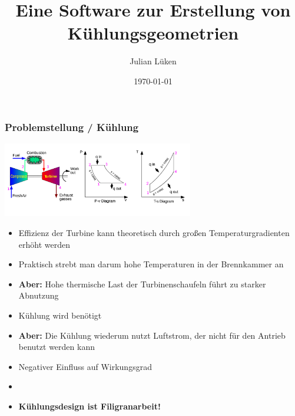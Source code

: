 \documentclass[8pt, aspectratio=169]{beamer}
\title[CoolingGen]{Eine Software zur Erstellung von Kühlungsgeometrien}
\author{Julian Lüken}
\date{\today}
\begin{document}
\begin{frame}[plain]
	\maketitle
\end{frame}

\begin{frame}
	\frametitle{Problemstellung / Kühlung}
	\vspace{-1cm}\hspace{-0.5cm}
	\centering
	\begin{minipage}[t]{0.8\textwidth}
		\centering
		\hspace{0.36\textwidth}
		\includegraphics[width=0.625\textwidth]{images/Brayton_cycle.svg.png}
	\end{minipage}
	\begin{minipage}[t]{\textwidth}
		\begin{itemize}
			\item Effizienz der Turbine kann theoretisch durch großen Temperaturgradienten erhöht werden
			\item[] 	\textrightarrow{} Praktisch strebt man darum hohe Temperaturen in der Brennkammer an
			\item 		\textbf{Aber:} Hohe thermische Last der Turbinenschaufeln führt zu starker Abnutzung
			\item[] 	\textrightarrow{} Kühlung wird benötigt
			\item 		\textbf{Aber:} Die Kühlung wiederum nutzt Luftstrom, der nicht für den Antrieb benutzt werden kann
			\item[] 	\textrightarrow{} Negativer Einfluss auf Wirkungsgrad
			\item[] 	{}
			\item[\textrightarrow] \textbf{Kühlungsdesign ist Filigranarbeit!}
		\end{itemize}
	\end{minipage}
	\vfill
\end{frame}
\end{document}
